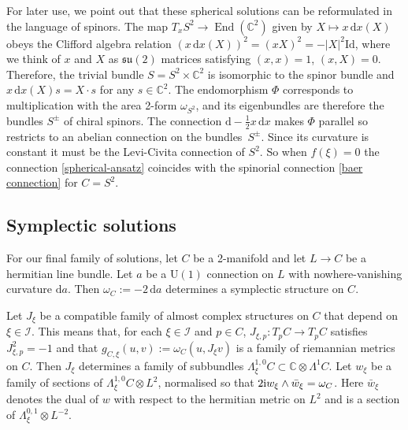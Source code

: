 \documentclass[10pt,a4paper]{amsart}
\newcommand{\II}{{\mathcal{I}}}
\newcommand{\su}{{\mathfrak{su}}}
\newcommand{\U}{{\mathrm{U}}}
\newcommand{\C}{{\mathbb{C}}}
\newcommand{\1}{{\mathbb{1}}}
\def \d{\mathrm{d}}
\numberwithin{equation}{section}
\begin{document}
For later use, we point out that these spherical solutions can be reformulated in the language of spinors. The map $T_xS^2\to \operatorname{End}(\C^2)$ given by $X\mapsto x\,\d x(X)$ obeys the Clifford algebra relation $(x\,\d x(X))^2= (xX)^2 =-|X|^2\mathrm{Id}$, where we think of $x$ and $X$ as $\su(2)$ matrices satisfying $(x,x)=1$, $(x,X)=0$. Therefore, the trivial bundle $S=S^2\times \C^2$ is isomorphic to the spinor bundle and $x\,\d x(X)s=X\cdot s$ for any $s\in\C^2$. The endomorphism $\Phi$ corresponds to multiplication with the area 2-form $\omega_{S^2}$, and its eigenbundles are therefore the bundles $S^\pm$ of chiral spinors. The connection $\d-\frac12x\,\d x$ makes $\Phi$ parallel so restricts to an abelian connection on the bundles~$S^\pm$. Since its curvature is constant it must be the Levi-Civita connection of $S^2$. So when $f(\xi)=0$ the connection \eqref{spherical-ansatz} coincides with the spinorial connection \eqref{baer connection} for $C=S^2$.

\subsection{Symplectic solutions}
\label{sec:symplectic}
For our final family of solutions, let $C$ be a 2-manifold and let $L\to C$ be a hermitian line bundle. Let $a$ be a $\U(1)$ connection on $L$ with nowhere-vanishing curvature $\d a$. Then $\omega_C:=-2\,\d a$ determines a symplectic structure on $C$.

Let $J_\xi$ be a compatible family of almost complex structures on $C$ that depend on $\xi\in\II$. This means that, for each $\xi\in\II$ and $p\in C$, $J_{\xi,p}\colon T_pC\to T_p C$ satisfies $J_{\xi,p}^2=-1$ and that $g_{C,\xi}(u,v):=\omega_C(u,J_\xi v)$ is a family of riemannian metrics on $C$. Then $J_\xi$ determines a family of subbundles $\Lambda^{1,0}_\xi C\subset\C\otimes\Lambda^1C$. Let $w_\xi$ be a family of sections of $\Lambda^{1,0}_\xi C\otimes L^2$, normalised so that $2{\rm i}w_\xi\wedge\bar{w}_\xi=\omega_C$. Here $\bar{w}_\xi$ denotes the dual of $w$ with respect to the hermitian metric on $L^2$ and is a section of $\Lambda^{0,1}_\xi\otimes L^{-2}$.
\end{document}
